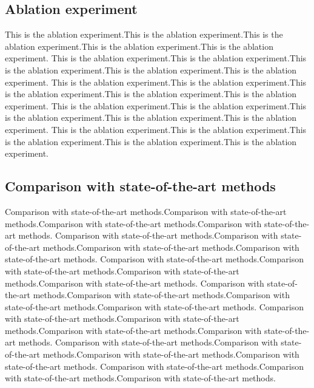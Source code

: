 \documentclass{article}
\begin{document}
\subsection{Ablation experiment}
\label{Ablation experiment}
This is the ablation experiment.This is the ablation experiment.This is the ablation experiment.This is the ablation experiment.This is the ablation experiment.
This is the ablation experiment.This is the ablation experiment.This is the ablation experiment.This is the ablation experiment.This is the ablation experiment.
This is the ablation experiment.This is the ablation experiment.This is the ablation experiment.This is the ablation experiment.This is the ablation experiment.
This is the ablation experiment.This is the ablation experiment.This is the ablation experiment.This is the ablation experiment.This is the ablation experiment.
This is the ablation experiment.This is the ablation experiment.This is the ablation experiment.This is the ablation experiment.This is the ablation experiment.

\subsection{Comparison with state-of-the-art methods}
\label{state-of-the-art methods}
Comparison with state-of-the-art methods.Comparison with state-of-the-art methods.Comparison with state-of-the-art methods.Comparison with state-of-the-art methods.
Comparison with state-of-the-art methods.Comparison with state-of-the-art methods.Comparison with state-of-the-art methods.Comparison with state-of-the-art methods.
Comparison with state-of-the-art methods.Comparison with state-of-the-art methods.Comparison with state-of-the-art methods.Comparison with state-of-the-art methods.
Comparison with state-of-the-art methods.Comparison with state-of-the-art methods.Comparison with state-of-the-art methods.Comparison with state-of-the-art methods.
Comparison with state-of-the-art methods.Comparison with state-of-the-art methods.Comparison with state-of-the-art methods.Comparison with state-of-the-art methods.
Comparison with state-of-the-art methods.Comparison with state-of-the-art methods.Comparison with state-of-the-art methods.Comparison with state-of-the-art methods.
Comparison with state-of-the-art methods.Comparison with state-of-the-art methods.Comparison with state-of-the-art methods.

\end{document}
